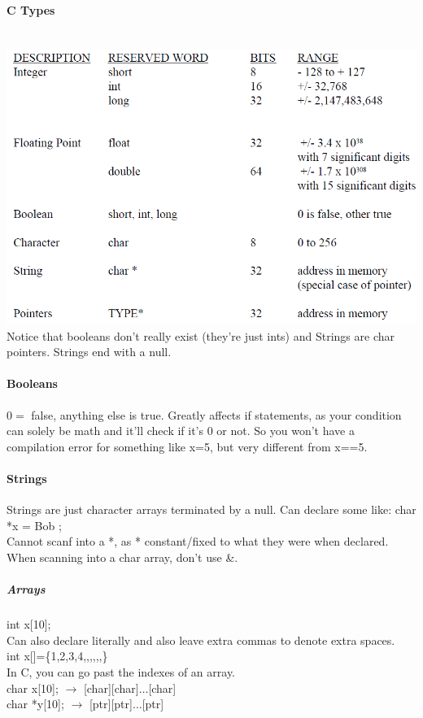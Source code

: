 \documentclass[12 pt]{article}
\begin{document}
\paragraph{C Types} ~\\
\includegraphics[scale=0.5]{ctyp} Notice that booleans don't really exist (they're just ints) and Strings are char pointers. Strings end with a null.
\paragraph{Booleans}
$0=$ false, anything else is true. Greatly affects if statements, as your condition can solely be math and it'll check if it's 0 or not. So you won't have a compilation error for something like x=5, but very different from x==5.
\paragraph{Strings} Strings are just character arrays terminated by a null. Can declare some like: char *x = \textquotedbl Bob \textquotedbl;
\\ Cannot scanf into a *, as * constant/fixed to what they were when declared. When scanning into a char array, don't use \&.
\subparagraph{Arrays} int x[10];
\\ Can also declare literally and also leave extra commas to denote extra spaces.
\\ int x[]=\{1,2,3,4,,,,,,\}
\\ In C, you can go past the indexes of an array. 
\\ char x[10]; $\to$ [char][char]$\ldots$[char]
\\ char *y[10]; $\to$ [ptr][ptr]$\ldots$[ptr]
\end{document}

